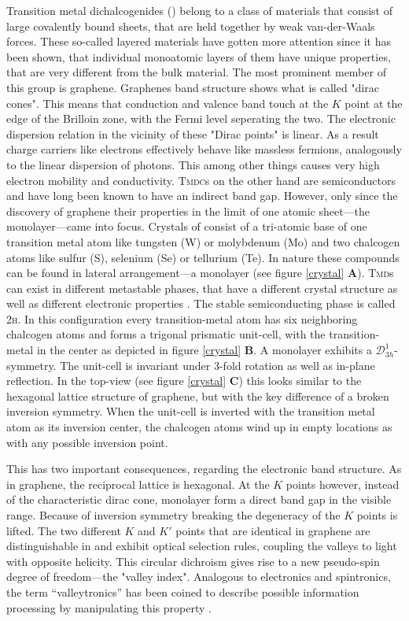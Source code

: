 Transition metal dichalcogenides (\tmds\!) belong to a class of materials that consist of large covalently bound sheets, that are held together by weak van-der-Waals forces. These so-called layered materials have gotten more attention since it has been shown, that individual monoatomic layers of them have unique properties, that are very different from the bulk material. The most prominent member of this group is graphene. Graphenes band structure shows what is called "dirac cones". This means that conduction and valence band touch at the $K$ point at the edge of the Brilloin zone, with the Fermi level seperating the two. The electronic dispersion relation in the vicinity of these "Dirac points" is linear. As a result charge carriers like electrons effectively behave like massless fermions, analogously to the linear dispersion of photons. This among other things causes very high electron mobility and conductivity. \textsc{Tmdc}s on the other hand are semiconductors and have long been known to have an indirect band gap. However, only since the discovery of graphene their properties in the limit of one atomic sheet---the monolayer---came into focus. Crystals of \tmds consist of a tri-atomic base of one transition metal atom like tungsten (W) or molybdenum (Mo) and two chalcogen atoms like sulfur (S), selenium (Se) or tellurium (Te). In nature these compounds can be found in lateral arrangement---a \tmdg monolayer (see figure \ref{crystal} \textbf{A}). \textsc{Tmd}s can exist in different metastable phases, that have a different crystal structure as well as different electronic properties \cite{ouyang_phase_2015}. The stable semiconducting phase is called 2\textsc{h}. In this configuration every transition-metal atom has six neighboring chalcogen atoms and forms a trigonal prismatic unit-cell, with the transition-metal in the center as depicted in figure \ref{crystal} \textbf{B}. A \tmdg monolayer exhibits a $\mathcal{D}^1_{3h}$-symmetry. The unit-cell is invariant under 3-fold rotation as well as in-plane reflection. In the top-view (see figure \ref{crystal} \textbf{C}) this looks similar to the hexagonal lattice structure of graphene, but with the key difference of a broken inversion symmetry. When the unit-cell is inverted with the transition metal atom as its inversion center, the chalcogen atoms wind up in empty locations as with any possible inversion point.

This has two important consequences, regarding the electronic band structure. As in graphene, the reciprocal lattice is hexagonal. At the $K$ points however, instead of the characteristic dirac cone, monolayer \tmds form a direct band gap in the visible range. Because of inversion symmetry breaking the degeneracy of the $K$ points is lifted. The two different $K$ and $K'$ points that are identical in graphene are distinguishable in \tmds and exhibit optical selection rules, coupling the valleys to light with opposite helicity. This circular dichroism gives rise to a new pseudo-spin degree of freedom---the "valley index". Analogous to electronics and spintronics, the term ``valleytronics'' has been coined to describe possible information processing by manipulating this property \cite{wang_electronics_2012, xiao_coupled_2012}. 


